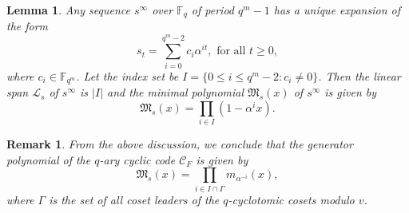 \documentclass[pdflatex,sn-mathphys-num]{sn-jnl}%
\newtheorem{lemma}{Lemma}
\theoremstyle{thmstyleone}%
\theoremstyle{thmstyletwo}%
\newtheorem{remark}{Remark}%
\theoremstyle{thmstylethree}%
\begin{document}
\vspace{1em}
\begin{lemma}\label{L6}
    Any sequence $s^{\infty}$ over $\mathbb{F}_{q}$ of period $q^m-1$ has a unique expansion of the form
    \begin{equation*}
        s_{t}=\sum_{i=0}^{q^m-2}c_{i}\alpha^{it},\text{ for all }t\geq 0,
    \end{equation*}
    where $c_{i}\in\mathbb{F}_{q^m}$. Let the index set be $I=\{0\leq i\leq q^m-2:c_{i}\neq 0\}$. Then the linear span $\mathcal{L}_{s}$ of $s^{\infty}$ is $|I|$ and the minimal polynomial $\mathfrak{M}_{s}(x)$ of $s^{\infty}$ is given by
    \begin{equation*}
        \mathfrak{M}_{s}(x)=\prod_{i\in I}(1-\alpha^{i}x).
    \end{equation*}
\end{lemma}
\begin{remark}
From the above discussion, we conclude that the generator polynomial of the $q$-ary cyclic code $\mathcal{C}_{F}$ is given by 
 \begin{equation*}
        \mathfrak{M}_{s}(x)=\prod_{i\in I\cap\Gamma}m_{\alpha^{-i}}(x),
    \end{equation*}
    where $\Gamma$ is the set of all coset leaders of the $q$-cyclotomic cosets modulo $v$.
\end{remark}
\end{document}
